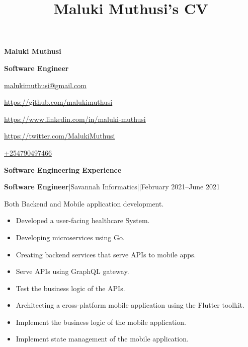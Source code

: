 \documentclass[a4paper]{article}
\begin{document}
\title{Maluki Muthusi's CV}

\begin{center}
    {\Large \textbf{Maluki Muthusi}} \par

    {\large \textbf{Software Engineer}}
\end{center}

\begin{description}[noitemsep]
    \item[\textbf{Email:}] \href{mailto:malukimuthusi@gmail.com}{malukimuthusi@gmail.com}
    \item[\textbf{Github:}] \url{https://github.com/malukimuthusi}
        \item[\textbf{LinkedIn:}]\url{https://www.linkedin.com/in/maluki-muthusi}
        \item[\textbf{Twitter:}]\url{https://twitter.com/MalukiMuthusi}
        \item[\textbf{Contact:}]\url{+254790497466}
\end{description}


\begin{center}
    {\Large \textbf{Software Engineering Experience}}
\end{center}

\textbf{Software Engineer}|Savannah Informatics||February 2021--June 2021

Both Backend and Mobile application development.

\begin{itemize}[noitemsep]
    \item Developed a user-facing healthcare System.
    \item Developing microservices using Go.
    \item Creating backend services that serve APIs to mobile apps.
    \item Serve APIs using GraphQL gateway.
    \item Test the business logic of the APIs.
    \item Architecting a cross-platform mobile application using the Flutter toolkit.
    \item Implement the business logic of the mobile application.
    \item Implement state management of the mobile application.

\end{itemize}
\end{document}
